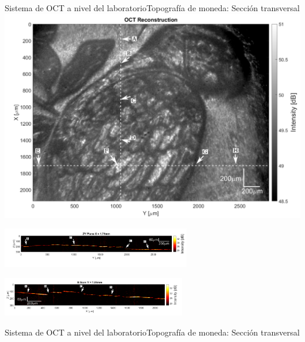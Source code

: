 \documentclass[fleqn,10pt]{beamer}
\begin{document}

\begin{frame}{Sistema de OCT a nivel del laboratorio}{Topografía de moneda: Sección transversal}
	\centering
	\vspace*{-0.1cm}
	\includegraphics[width=0.7\linewidth]{AAUgraphics/pt2/OCT_Reconstruction_Moneda}
	
	\includegraphics[width=8.2cm]{AAUgraphics/pt2/ZYPlane_moneda}

	\vspace*{-0.3cm}
	\hspace*{0.3cm}
	\includegraphics[width=8cm]{AAUgraphics/pt2/Bscan_Moneda}
\end{frame}

\begin{frame}{Sistema de OCT a nivel del laboratorio}{Topografía de moneda: Sección transversal}
	
	
	\begin{center}
	\end{center}
\end{frame}
	
\end{document}

